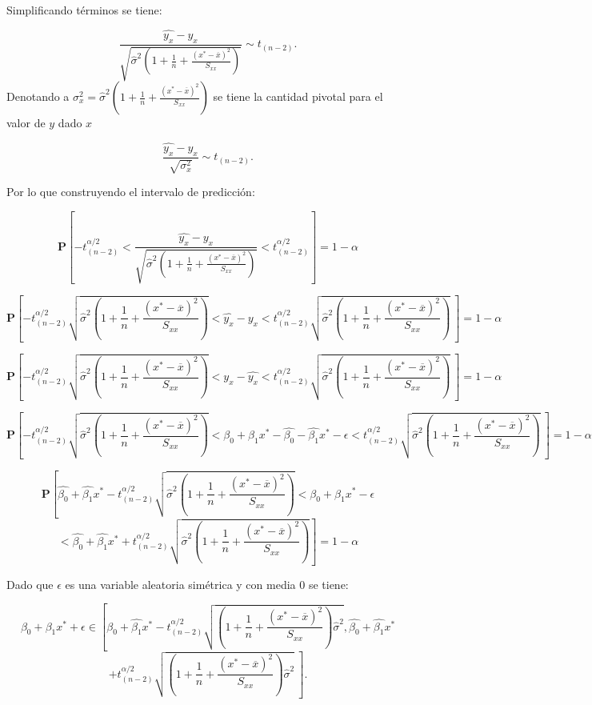 \documentclass[
  a4paper,
  oneside,
  openany]{book}
\begin{document}
Simplificando términos se tiene:

\[\frac{\hat{y_{x}}-y_{x}}{\sqrt{\hat{\sigma}^2\left(1+ \frac{1}{n}+\frac{(x^*-\overline{x})^2}{S_{xx}}\right)}}\sim t_{(n-2)}.\]
Denotando a \(\sigma^2_{x}=\hat{\sigma}^2\left(1+ \frac{1}{n}+\frac{(x^*-\overline{x})^2}{S_{xx}}\right)\) se tiene la cantidad pivotal para el valor de \(y\) dado \(x\)

\[\frac{\hat{y_{x}}-y_{x}}{\sqrt{\sigma_{x}^2}}\sim t_{(n-2)}.\]

Por lo que construyendo el intervalo de predicción:

\[\mathbf{P}\left[-t^{\alpha/2}_{(n-2)}<\frac{\hat{y_{x}}-y_{x}}{\sqrt{\hat{\sigma}^2\left(1+ \frac{1}{n}+\frac{(x^*-\overline{x})^2}{S_{xx}}\right)}}<t^{\alpha/2}_{(n-2)}\right]=1-\alpha\]

\[\mathbf{P}\left[-t^{\alpha/2}_{(n-2)}\sqrt{\hat{\sigma}^2\left(1+ \frac{1}{n}+\frac{(x^*-\overline{x})^2}{S_{xx}}\right)}<\hat{y_{x}}-y_{x}<t^{\alpha/2}_{(n-2)}\sqrt{\hat{\sigma}^2\left(1+ \frac{1}{n}+\frac{(x^*-\overline{x})^2}{S_{xx}}\right)} \ \right]=1-\alpha\]

\[\mathbf{P}\left[-t^{\alpha/2}_{(n-2)}\sqrt{\hat{\sigma}^2\left(1+ \frac{1}{n}+\frac{(x^*-\overline{x})^2}{S_{xx}}\right)}<y_{x}-\hat{y_{x}}<t^{\alpha/2}_{(n-2)}\sqrt{\hat{\sigma}^2\left(1+ \frac{1}{n}+\frac{(x^*-\overline{x})^2}{S_{xx}}\right)} \ \right]=1-\alpha\]

\[\mathbf{P}\left[-t^{\alpha/2}_{(n-2)}\sqrt{\hat{\sigma}^2\left(1+ \frac{1}{n}+\frac{(x^*-\overline{x})^2}{S_{xx}}\right)}<\beta_{0}+\beta_{1}x^*-\hat{\beta_{0}}-\hat{\beta_{1}}x^*-\epsilon<t^{\alpha/2}_{(n-2)}\sqrt{\hat{\sigma}^2\left(1+ \frac{1}{n}+\frac{(x^*-\overline{x})^2}{S_{xx}}\right)} \ \right]=1-\alpha\]

\[\mathbf{P}\left[\hat{\beta_{0}}+\hat{\beta_{1}}x^*-t^{\alpha/2}_{(n-2)}\sqrt{\hat{\sigma}^2\left(1+ \frac{1}{n}+\frac{(x^*-\overline{x})^2}{S_{xx}}\right)}<\beta_{0}+\beta_{1}x^*-\epsilon\right.\]
\[\left. <\hat{\beta_{0}}+\hat{\beta_{1}}x^*+t^{\alpha/2}_{(n-2)}\sqrt{\hat{\sigma}^2\left(1+ \frac{1}{n}+\frac{(x^*-\overline{x})^2}{S_{xx}}\right)}\right]=1-\alpha\]

Dado que \(\epsilon\) es una variable aleatoria simétrica y con media 0 se tiene:

\[\beta_{0}+\beta_{1}x^*+\epsilon \in \left[\hat{\beta_{0}}+\hat{\beta_{1}}x^*-t^{\alpha/2}_{(n-2)}\sqrt{\left(1+ \frac{1}{n}+\frac{(x^*-\overline{x})^2}{S_{xx}}\right)\hat{\sigma}^2},\hat{\beta_{0}}+\hat{\beta_{1}}x^*\right.\]
\[\left.+t^{\alpha/2}_{(n-2)}\sqrt{\left(1+ \frac{1}{n}+\frac{(x^*-\overline{x})^2}{S_{xx}}\right)\hat{\sigma}^2} \ \right].\]
\end{document}
